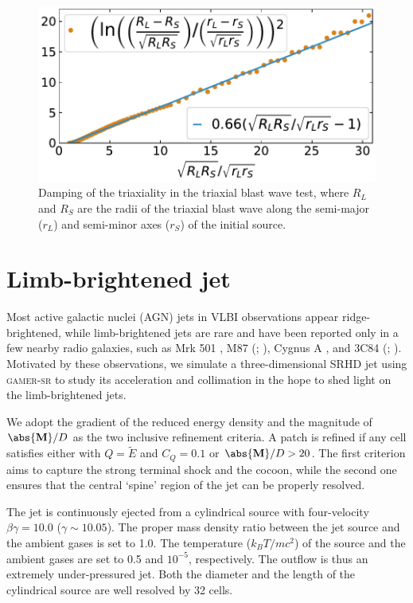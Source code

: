\begin{figure}
\includegraphics[width=\linewidth]{srhd-figures/fig__AxesRatio.pdf}
\caption{Damping of the triaxiality in the triaxial blast wave test, where $R_{L}$ and $R_{S}$ are the radii of the triaxial blast wave along the semi-major ($r_{L}$) and semi-minor axes ($r_{S}$) of the initial source.}
\label{fig:BlastFitting}
\end{figure}

\section{Limb-brightened jet}
\label{Limb-brightened jet}
Most active galactic nuclei (AGN) jets in VLBI observations appear ridge-brightened, while limb-brightened jets are rare and have been reported only in a few nearby radio galaxies, such as Mrk 501 \citep{Giroletti2004}, M87 (\citealt{Asada2012}; \citealt{Kim2018}), Cygnus A \citep{Boccardi2015}, and 3C84 (\citealt{Nagai_2014}; \citealt{Giovannini2018}). Motivated by these observations, we simulate a three-dimensional SRHD jet using \textsc{gamer-sr} to study its acceleration and collimation in the hope to shed light on the limb-brightened jets.

We adopt the gradient of the reduced energy density and the magnitude of $\abs{\mathbf{M}}/D$ as the two inclusive refinement criteria. A patch is refined if any cell satisfies either  with $Q=\tilde{E}$ and $C_{Q}=0.1$ or $\abs{\mathbf{M}}/D>20$. The first criterion aims to capture the strong terminal shock and the cocoon, while the second one ensures that the central `spine' region of the jet can be properly resolved.

The jet is continuously ejected from a cylindrical source with four-velocity $\beta\gamma=10.0$ ($\gamma \sim 10.05$). The proper mass density ratio between the jet source and the ambient gases is set to 1.0. The temperature ($k_{B}T/mc^2$) of the source and the ambient gases are set to 0.5 and $10^{-5}$, respectively. The outflow is thus an extremely under-pressured jet. Both the diameter and the length of the cylindrical source are well resolved by 32 cells.


